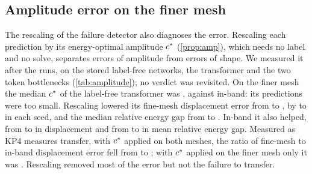 \subsection{Amplitude error on the finer mesh}\label{sec:transfer:amplitude}



The rescaling of the failure detector also diagnoses the error. Rescaling each prediction
by its energy-optimal amplitude $c^{\ast}$ (\cref{prop:amp}), which needs no label and no
solve, separates errors of amplitude from errors of shape. We measured it after the runs,
on the stored label-free networks, the transformer and the two token bottlenecks
(\cref{tab:amplitude}); no verdict was revisited. On the finer mesh the median $c^{\ast}$ of
the label-free transformer was \numAmpFineCstar{}, against \numAmpInCstar{} in-band: its
predictions were too small. Rescaling lowered its fine-mesh displacement error from
\numAmpFineDisp{} to \numAmpFineDispC{}, by \numAmpFineRedMin{} to \numAmpFineRedMax{} in
each seed, and the median relative energy gap from \numAmpFineGapMedian{} to
\numAmpFineGapMedianC{}. In-band it also helped, from \numAmpInDisp{} to \numAmpInDispC{} in
displacement and from \numAmpInGap{} to \numAmpInGapC{} in mean relative energy gap.
Measured as KP4 measures transfer, with $c^{\ast}$ applied on both meshes, the ratio of
fine-mesh to in-band displacement error fell from \numFineRatio{} to \numAmpRatioBoth{};
with $c^{\ast}$ applied on the finer mesh only it was \numAmpRatioFineOnly{}. Rescaling
removed most of the error but not the failure to transfer.



